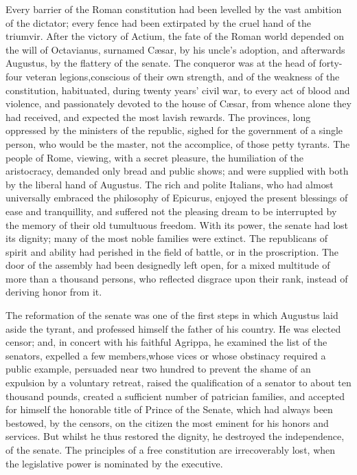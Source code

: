 Every barrier of the Roman constitution had been levelled by the
vast ambition of the dictator; every fence had been extirpated by
the cruel hand of the triumvir. After the victory of Actium, the
fate of the Roman world depended on the will of Octavianus,
surnamed Cæsar, by his uncle’s adoption, and afterwards Augustus,
by the flattery of the senate. The conqueror was at the head of
forty-four veteran legions,\footnotemark[1] conscious of their own strength,
and of the weakness of the constitution, habituated, during
twenty years’ civil war, to every act of blood and violence, and
passionately devoted to the house of Cæsar, from whence alone
they had received, and expected the most lavish rewards. The
provinces, long oppressed by the ministers of the republic,
sighed for the government of a single person, who would be the
master, not the accomplice, of those petty tyrants. The people of
Rome, viewing, with a secret pleasure, the humiliation of the
aristocracy, demanded only bread and public shows; and were
supplied with both by the liberal hand of Augustus. The rich and
polite Italians, who had almost universally embraced the
philosophy of Epicurus, enjoyed the present blessings of ease and
tranquillity, and suffered not the pleasing dream to be
interrupted by the memory of their old tumultuous freedom. With
its power, the senate had lost its dignity; many of the most
noble families were extinct. The republicans of spirit and
ability had perished in the field of battle, or in the
proscription. The door of the assembly had been designedly left
open, for a mixed multitude of more than a thousand persons, who
reflected disgrace upon their rank, instead of deriving honor
from it.\footnotemark[2]



The reformation of the senate was one of the first steps in which
Augustus laid aside the tyrant, and professed himself the father
of his country. He was elected censor; and, in concert with his
faithful Agrippa, he examined the list of the senators, expelled
a few members,\footnotemark[201] whose vices or whose obstinacy required a
public example, persuaded near two hundred to prevent the shame
of an expulsion by a voluntary retreat, raised the qualification
of a senator to about ten thousand pounds, created a sufficient
number of patrician families, and accepted for himself the
honorable title of Prince of the Senate, \footnotemark[202] which had always
been bestowed, by the censors, on the citizen the most eminent
for his honors and services. \footnotemark[3] But whilst he thus restored the
dignity, he destroyed the independence, of the senate. The
principles of a free constitution are irrecoverably lost, when
the legislative power is nominated by the executive.


